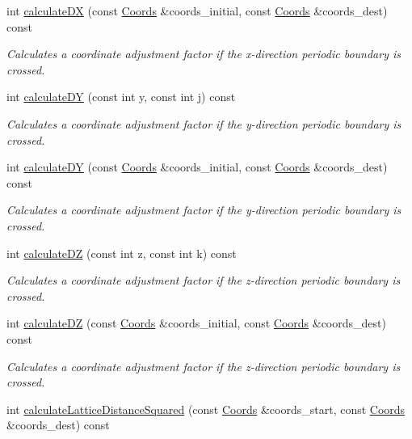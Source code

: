\begin{DoxyCompactItemize}
int \hyperlink{class_lattice_ad89c5473dd37339ede9fb3d0c3db4300}{calculate\+DX} (const \hyperlink{struct_coords}{Coords} \&coords\+\_\+initial, const \hyperlink{struct_coords}{Coords} \&coords\+\_\+dest) const
\begin{DoxyCompactList}\small\item\em Calculates a coordinate adjustment factor if the x-\/direction periodic boundary is crossed. \end{DoxyCompactList}\item 
int \hyperlink{class_lattice_acdeca889f7df11fe299f8b7941198c83}{calculate\+DY} (const int y, const int j) const
\begin{DoxyCompactList}\small\item\em Calculates a coordinate adjustment factor if the y-\/direction periodic boundary is crossed. \end{DoxyCompactList}\item 
int \hyperlink{class_lattice_a4e8b3577701ec0cefce595f6956b22e3}{calculate\+DY} (const \hyperlink{struct_coords}{Coords} \&coords\+\_\+initial, const \hyperlink{struct_coords}{Coords} \&coords\+\_\+dest) const
\begin{DoxyCompactList}\small\item\em Calculates a coordinate adjustment factor if the y-\/direction periodic boundary is crossed. \end{DoxyCompactList}\item 
int \hyperlink{class_lattice_a584ff9c528ebe46a6aea6ed652d107f4}{calculate\+DZ} (const int z, const int k) const
\begin{DoxyCompactList}\small\item\em Calculates a coordinate adjustment factor if the z-\/direction periodic boundary is crossed. \end{DoxyCompactList}\item 
int \hyperlink{class_lattice_a76b38079e102e17c79b13a3398a404a0}{calculate\+DZ} (const \hyperlink{struct_coords}{Coords} \&coords\+\_\+initial, const \hyperlink{struct_coords}{Coords} \&coords\+\_\+dest) const
\begin{DoxyCompactList}\small\item\em Calculates a coordinate adjustment factor if the z-\/direction periodic boundary is crossed. \end{DoxyCompactList}\item 
int \hyperlink{class_lattice_a3f51b0b41cf0e43e0469320310494a1e}{calculate\+Lattice\+Distance\+Squared} (const \hyperlink{struct_coords}{Coords} \&coords\+\_\+start, const \hyperlink{struct_coords}{Coords} \&coords\+\_\+dest) const

\end{DoxyCompactItemize}
